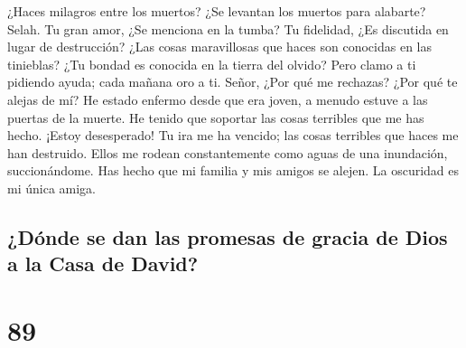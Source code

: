  ¿Haces milagros entre los muertos? ¿Se levantan los
muertos para alabarte? Selah.  Tu gran amor, ¿Se menciona
en la tumba? Tu fidelidad, ¿Es discutida en lugar de destrucción?
 ¿Las cosas maravillosas que haces son conocidas en las
tinieblas? ¿Tu bondad es conocida en la tierra del olvido? 
Pero clamo a ti pidiendo ayuda; cada mañana oro a ti. 
Señor, ¿Por qué me rechazas? ¿Por qué te alejas de mí?  He
estado enfermo desde que era joven, a menudo estuve a las puertas de la
muerte. He tenido que soportar las cosas terribles que me has hecho.
¡Estoy desesperado!  Tu ira me ha vencido; las cosas
terribles que haces me han destruido.  Ellos me rodean
constantemente como aguas de una inundación, succionándome.
 Has hecho que mi familia y mis amigos se alejen. La
oscuridad es mi única amiga.

\hypertarget{duxf3nde-se-dan-las-promesas-de-gracia-de-dios-a-la-casa-de-david}{%
\subsection{¿Dónde se dan las promesas de gracia de Dios a la Casa de
David?}\label{duxf3nde-se-dan-las-promesas-de-gracia-de-dios-a-la-casa-de-david}}

\hypertarget{section-88}{%
\section{89}\label{section-88}}

